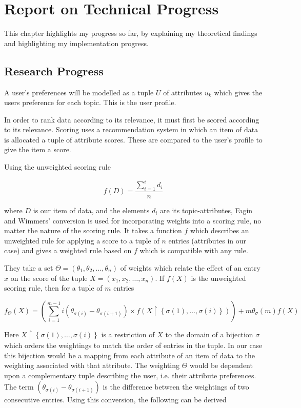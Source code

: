 \chapter{Report on Technical Progress}

This chapter highlights my progress so far, by explaining my theoretical findings and highlighting my implementation progress. 

\section{Research Progress}

A user's preferences will be modelled as a tuple $U$ of attributes $u_k$ which gives the users preference for each topic. This is the user profile.

In order to rank data according to its relevance, it must first be scored according to its relevance. Scoring uses a recommendation system in which an item of data is allocated a tuple of attribute scores. These are compared to the user's profile to give the item a score.

Using the unweighted scoring rule

\begin{equation}\label{AverageUnweightedRule}	
	f(D) = \frac{\sum_{i=1}^{i} d_i}{n}
\end{equation}

where $D$ is our item of data, and the elements $d_i$ are its topic-attributes, Fagin and Wimmers' \cite{FaginWimmers1} conversion is used for incorporating weights into a scoring rule, no matter the nature of the scoring rule. It takes a function $f$ which describes an unweighted rule for applying a score to a tuple of $n$ entries (attributes in our case) and gives a weighted rule based on $f$ which is compatible with any rule. 

They take a set $\Theta = (\theta_1,\theta_2,\dotsc,\theta_n)$ of weights which relate the effect of an entry $x$ on the score of the tuple $ X = (x_1, x_2, \dots, x_n)$. If $f(X)$ is the unweighted scoring rule, then for a tuple of $m$ entries

\begin{equation}\label{WeightedRule}	
	f_\Theta (X) = \left(\sum_{i=1}^{m-1} i(\theta_{\sigma{(i)}} - \theta_{\sigma{(i+1)}})\times f(X\upharpoonright\left\{\sigma(1),\dots,\sigma(i)\right\})\right) + m  \theta_\sigma{(m)}  f(X)
\end{equation}

Here $X\restriction\left\{\sigma(1),\dots,\sigma(i)\right\}$ is a restriction of $X$ to the domain of a bijection $\sigma$ which orders the weightings to match the order of entries in the tuple. In our case this bijection would be a mapping from each attribute of an item of data to the weighting associated with that attribute. The weighting $\Theta$ would be dependent upon a complementary tuple describing the user, i.e. their attribute preferences. The term $(\theta_{\sigma{(i)}} - \theta_{\sigma{(i+1)}})$ is the difference between the weightings of two consecutive entries. 
Using this conversion, the following can be derived

